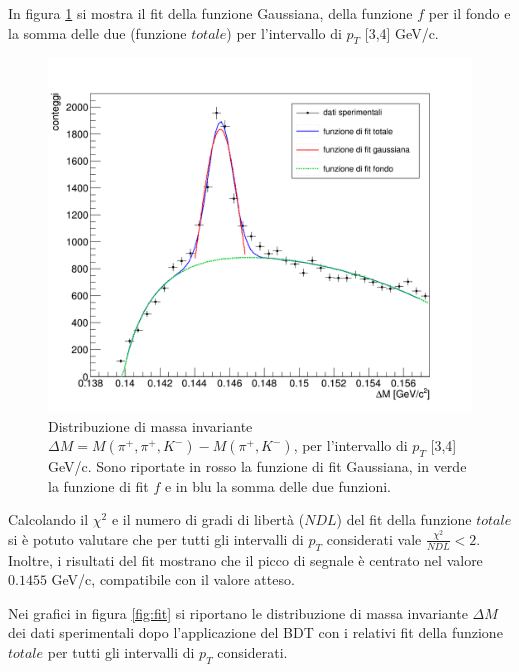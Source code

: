 In figura \ref{fig:fit_3_4_p} si mostra il fit della funzione Gaussiana, della funzione $f$ per il fondo e la somma delle due (funzione $totale$) per l'intervallo di $p_T$ [3,4] GeV/c.
    \begin{figure}[htpb] 
        \centering
        \includegraphics[width=0.8\linewidth]{AnalisiDati/fit_3_4.png}
        \caption{Distribuzione di massa invariante $\Delta M = M(\pi^+,\pi^+,K^-) - M(\pi^+,K^-)$, per l'intervallo di $p_T$ [3,4] GeV/c. Sono riportate in rosso la funzione di fit Gaussiana, in verde la funzione di fit $f$ e in blu la somma delle due funzioni. }
        \label{fig:fit_3_4_p}
    \end{figure}

Calcolando il $\chi^2$ e il numero di gradi di libert\`a ($NDL$) del fit della funzione $totale$ si \`e potuto valutare che per tutti gli intervalli di $p_T$ considerati vale $\frac{\chi^2}{NDL} < 2$. Inoltre, i risultati del fit mostrano che il picco di segnale \`e centrato nel valore $0.1455$ GeV/c, compatibile con il valore atteso. 

Nei grafici in figura \ref{fig:fit} si riportano le distribuzione di massa invariante $\Delta M$ dei dati sperimentali dopo l'applicazione del BDT con i relativi fit della funzione $totale$ per tutti gli intervalli di $p_T$ considerati.


